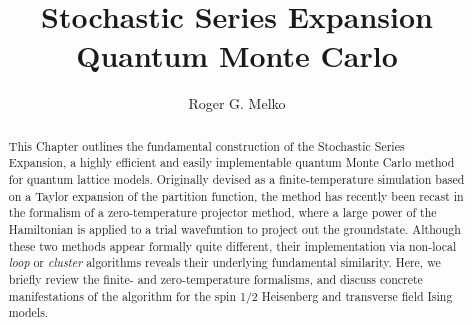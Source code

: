 \documentclass[vecphys]{svmult}
\begin{document}
\title{Stochastic Series Expansion Quantum Monte Carlo}
\author{Roger G. Melko}

\maketitle

\begin{abstract}
This 	Chapter outlines the fundamental construction of the Stochastic Series Expansion, a highly efficient and easily implementable quantum Monte Carlo method for quantum lattice models.
Originally devised as a finite-temperature simulation based on a Taylor expansion of the partition function, the method has recently been 
recast in the formalism of a zero-temperature projector method, where a large power of the Hamiltonian is applied to a trial wavefuntion to project out the groundstate.  Although these two methods appear formally quite different, their implementation via non-local \textit{loop} or \textit{cluster} algorithms reveals their underlying fundamental similarity.  Here, we briefly review the finite- and zero-temperature formalisms, and discuss concrete manifestations of the algorithm for the spin 1/2 Heisenberg and transverse field Ising models.
\end{abstract}

\end{document}

